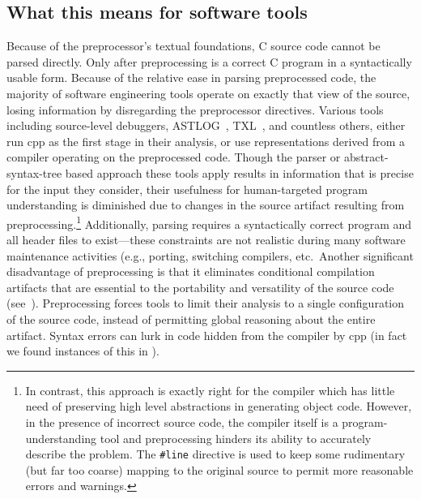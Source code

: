 \documentclass{article}
\newcommand{\Cpp}{\mbox{\textsf{cpp}}}
\newcommand{\C}{\mbox{\textsf{C}}}
\newcommand{\ppd}[1]{\texttt{\##1}}
\newcommand{\eg}{e.g.,}
\newcommand{\etc}{etc}  %
\begin{document}

\subsection{What this means for software tools}

Because of the preprocessor's textual foundations, \C{} source code
cannot be parsed directly.  Only after preprocessing is a correct \C{}
program in a syntactically usable form. Because of the relative ease in
parsing preprocessed code, the majority of software engineering tools
operate on exactly that view of the source, losing information by
disregarding the preprocessor directives.  Various tools including
source-level debuggers, ASTLOG~\cite{Crew97}, TXL~\cite{TXL}, and
countless others, either run \Cpp{} as the first stage in their
analysis, or use representations derived from a compiler operating on
the preprocessed code.  Though the parser or abstract-syntax-tree based
approach these tools apply results in information that is precise for
the input they consider, their usefulness for human-targeted program
understanding is diminished due to changes in the source artifact
resulting from preprocessing.\footnote{In contrast, this approach is
  exactly right for the compiler which has little need of preserving
  high level abstractions in generating object code.  However, in the
  presence of incorrect source code, the compiler itself is a
  program-understanding tool and preprocessing hinders its ability to
  accurately describe the problem.  The \ppd{line} directive is used to
  keep some rudimentary (but far too coarse) mapping to the original
  source to permit more reasonable errors and warnings.}  Additionally,
parsing requires a syntactically correct program and all header files to
exist---these constraints are not realistic during many software
maintenance activities (\eg{} porting, switching compilers, \etc.\ 
Another significant disadvantage of preprocessing is that it eliminates
conditional compilation artifacts that are essential to the portability
and versatility of the source code (see~\cite{Krone94}).  Preprocessing
forces tools to limit their analysis to a single configuration of the
source code, instead of permitting global reasoning about the entire
artifact.  Syntax errors can lurk in code hidden from the compiler by
\Cpp{} (in fact we found instances of this in \cite{EmpCpp}).
\end{document}

